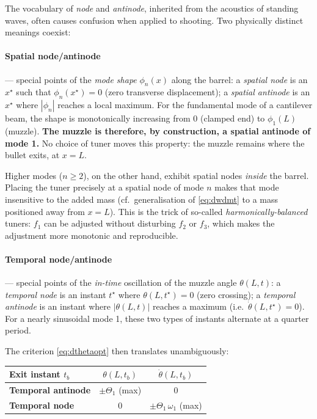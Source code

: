\documentclass[12pt,a4paper]{article}
\begin{document}
	The vocabulary of \emph{node} and \emph{antinode}, inherited from the acoustics of standing waves, often causes confusion when applied to shooting. Two physically distinct meanings coexist:

	\paragraph{Spatial node/antinode} --- special points of the \emph{mode shape} $\phi_n(x)$ along the barrel: a \emph{spatial node} is an $x^\star$ such that $\phi_n(x^\star)=0$ (zero transverse displacement); a \emph{spatial antinode} is an $x^\star$ where $|\phi_n|$ reaches a local maximum. For the fundamental mode of a cantilever beam, the shape is monotonically increasing from 0 (clamped end) to $\phi_1(L)$ (muzzle). \textbf{The muzzle is therefore, by construction, a spatial antinode of mode 1.} No choice of tuner moves this property: the muzzle remains where the bullet exits, at $x=L$.

	Higher modes ($n\ge 2$), on the other hand, exhibit spatial nodes \emph{inside} the barrel. Placing the tuner precisely at a spatial node of mode $n$ makes that mode insensitive to the added mass (cf.\ generalisation of \eqref{eq:dwdmt} to a mass positioned away from $x=L$). This is the trick of so-called \emph{harmonically-balanced} tuners: $f_1$ can be adjusted without disturbing $f_2$ or $f_3$, which makes the adjustment more monotonic and reproducible.

	\paragraph{Temporal node/antinode} --- special points of the \emph{in-time} oscillation of the muzzle angle $\theta(L,t)$: a \emph{temporal node} is an instant $t^\star$ where $\theta(L,t^\star)=0$ (zero crossing); a \emph{temporal antinode} is an instant where $|\theta(L,t)|$ reaches a maximum (i.e.\ $\dot\theta(L,t^\star)=0$). For a nearly sinusoidal mode 1, these two types of instants alternate at a quarter period.

	The criterion \eqref{eq:dthetaopt} then translates unambiguously:
	\begin{center}
	\begin{tabular}{lcc}
		\toprule
		Exit instant $t_b$ & $\theta(L,t_b)$ & $\dot\theta(L,t_b)$ \\
		\midrule
		\textbf{Temporal antinode} & $\pm\Theta_1$ (max) & $0$ \\
		\textbf{Temporal node} & $0$ & $\pm\Theta_1\,\omega_1$ (max) \\
		\bottomrule
	\end{tabular}
	\end{center}
\end{document}
